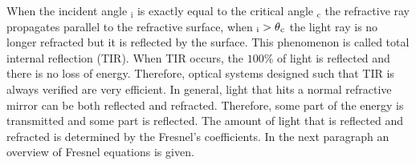 When the incident angle \myangle$_{\textrm{i}}$ is exactly equal to the critical angle \myangle$_{\textrm{c}}$ the refractive ray propagates parallel to the refractive surface, 
when \myangle$_{\textrm{i}}>\mbox{$\theta$}_{\textrm{c}}$ the light ray is no longer refracted but it is reflected by the surface. This phenomenon is called total internal reflection (TIR). When TIR occurs, the $100\%$ of light is reflected and there is no loss of energy. Therefore, optical systems designed such that TIR is always verified are very efficient. In general, light that hits a normal refractive mirror can be both reflected and refracted. Therefore, some part of the energy is transmitted and some part is reflected. The amount of light that is reflected and refracted is determined by the Fresnel's coefficients.
In the next paragraph an overview of  Fresnel equations is given.


